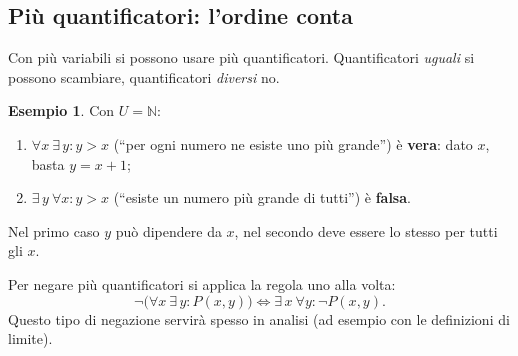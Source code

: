 \documentclass[11pt,a4paper]{article}
\theoremstyle{definition}
\newtheorem*{esempio}{Esempio}
\begin{document}
\subsection{Più quantificatori: l'ordine conta}

Con più variabili si possono usare più quantificatori. Quantificatori
\emph{uguali} si possono scambiare, quantificatori \emph{diversi} no.

\begin{esempio}
Con $U = \mathbb{N}$:
\begin{enumerate}
    \item $\forall x\ \exists\, y : y > x$ \quad (``per ogni numero ne
          esiste uno più grande'') è \textbf{vera}: dato $x$, basta
          $y = x + 1$;
    \item $\exists\, y\ \forall x : y > x$ \quad (``esiste un numero più
          grande di tutti'') è \textbf{falsa}.
\end{enumerate}
Nel primo caso $y$ può dipendere da $x$, nel secondo deve essere lo stesso
per tutti gli $x$.
\end{esempio}

Per negare più quantificatori si applica la regola uno alla volta:
\[
\neg\big(\forall x\ \exists\, y : P(x,y)\big) \iff
\exists\, x\ \forall y : \neg P(x,y).
\]
Questo tipo di negazione servirà spesso in analisi (ad esempio con le
definizioni di limite).
\end{document}
